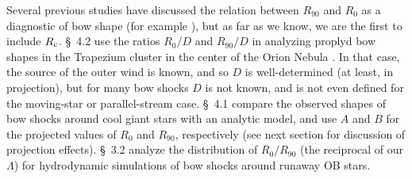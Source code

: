 Several previous studies have discussed the relation between
\(R_{90}\) and \(R_0\) as a diagnostic of bow shape (for example
\citealp{Robberto:2005, Cox:2012a, Meyer:2016a}), but as far as we
know, we are the first to include \(R_{\mathrm{c}}\).  \citet{Robberto:2005}
\S~4.2 use the ratios \(R_0/D\) and \(R_{90}/D\) in analyzing proplyd
bow shapes in the Trapezium cluster in the center of the Orion Nebula
\citep{Hayward:1994a, Garcia-Arredondo:2001a, Smith:2005a}.  In that
case, the source of the outer wind is known, and so \(D\) is
well-determined (at least, in projection), but for many bow shocks
\(D\) is not known, and is not even defined for the moving-star or
parallel-stream case. \citet{Cox:2012a} \S~4.1 compare the observed
shapes of bow shocks around cool giant stars with an analytic model,
and use \(A\) and \(B\) for the projected values of \(R_0\) and
\(R_{90}\), respectively (see next section for discussion of
projection effects).  \citet{Meyer:2016a} \S~3.2 analyze the
distribution of \(R_0 / R_{90}\) (the reciprocal of our \(\Lambda\)) for
hydrodynamic simulations of bow shocks around runaway OB stars.








